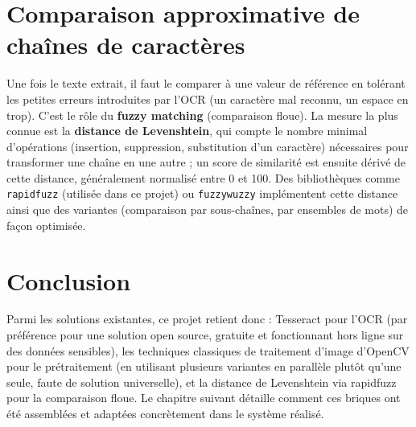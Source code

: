 \section{Comparaison approximative de chaînes de caractères}

Une fois le texte extrait, il faut le comparer à une valeur de référence en tolérant les petites erreurs introduites par l'OCR (un caractère mal reconnu, un espace en trop). C'est le rôle du \textbf{fuzzy matching} (comparaison floue). La mesure la plus connue est la \textbf{distance de Levenshtein}, qui compte le nombre minimal d'opérations (insertion, suppression, substitution d'un caractère) nécessaires pour transformer une chaîne en une autre ; un score de similarité est ensuite dérivé de cette distance, généralement normalisé entre 0 et 100. Des bibliothèques comme \texttt{rapidfuzz} (utilisée dans ce projet) ou \texttt{fuzzywuzzy} implémentent cette distance ainsi que des variantes (comparaison par sous-chaînes, par ensembles de mots) de façon optimisée.

\section{Conclusion}

Parmi les solutions existantes, ce projet retient donc : Tesseract pour l'OCR (par préférence pour une solution open source, gratuite et fonctionnant hors ligne sur des données sensibles), les techniques classiques de traitement d'image d'OpenCV pour le prétraitement (en utilisant plusieurs variantes en parallèle plutôt qu'une seule, faute de solution universelle), et la distance de Levenshtein via rapidfuzz pour la comparaison floue. Le chapitre suivant détaille comment ces briques ont été assemblées et adaptées concrètement dans le système réalisé.
